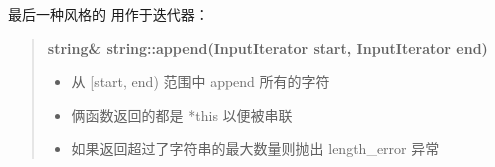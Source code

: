 \documentclass[../../LearnCpp.tex]{subfiles}
\begin{document}
最后一种风格的  用作于迭代器：

\begin{quotation}
  \textbf{string\& string::append(InputIterator start, InputIterator end)}

  \begin{itemize}
    \item 从 [start, end) 范围中 append 所有的字符
    \item 俩函数返回的都是 *this 以便被串联
    \item 如果返回超过了字符串的最大数量则抛出 length\_error 异常
  \end{itemize}
\end{quotation}
\end{document}
